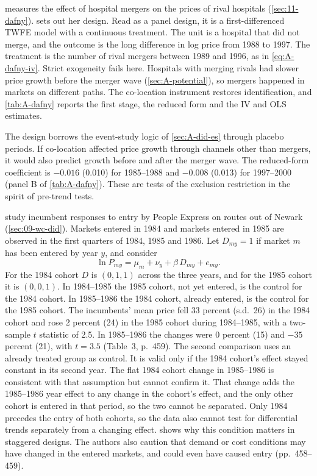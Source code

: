 \citet{Dafny2009} measures the effect of hospital mergers on the prices of rival hospitals (\cref{sec:11-dafny}).
 sets out her design. Read as a panel design, it is a first-differenced TWFE model with a
continuous treatment. The unit is a hospital that did not merge, and the outcome is the long difference in log price
from 1988 to 1997. The treatment is the number of rival mergers between 1989 and 1996, as in \eqref{eq:A-dafny-iv}.
Strict exogeneity fails here. Hospitals with merging rivals had slower price growth before the merger wave
(\cref{sec:A-potential}), so mergers happened in markets on different paths. The co-location instrument restores
identification, and \cref{tab:A-dafny} reports the first stage, the reduced form and the IV and OLS estimates.

The design borrows the event-study logic of \cref{sec:A-did-es} through placebo periods. If co-location affected
price growth through channels other than mergers, it would also predict growth before and after the merger wave.
The reduced-form coefficient is $-0.016$ (0.010) for 1985--1988 and $-0.008$ (0.013) for 1997--2000 (panel B of
\cref{tab:A-dafny}). These are tests of the exclusion restriction in the spirit of pre-trend tests.

\citet{WhinstonCollins1992} study incumbent responses to entry by People Express on routes out of Newark
(\cref{sec:09-wc-did}). Markets entered in 1984 and markets entered in 1985 are observed in the first quarters of
1984, 1985 and 1986. Let $D_{my}=1$ if market $m$ has been entered by year $y$, and consider
\begin{equation*}
\ln P_{my}=\mu_m+\nu_y+\beta\,D_{my}+e_{my}.
\end{equation*}
For the 1984 cohort $D$ is $(0,1,1)$ across the three years, and for the 1985 cohort it is $(0,0,1)$. In 1984--1985
the 1985 cohort, not yet entered, is the control for the 1984 cohort. In 1985--1986 the 1984 cohort, already entered,
is the control for the 1985 cohort. The incumbents' mean price fell 33 percent (s.d.\ 26) in the 1984 cohort and rose
2 percent (24) in the 1985 cohort during 1984--1985, with a two-sample $t$ statistic of 2.5. In 1985--1986 the
changes were 0 percent (15) and $-35$ percent (21), with $t=3.5$ (Table~3, p.~459). The second comparison uses an
already treated group as control. It is valid only if the 1984 cohort's effect stayed constant in its second year.
The flat 1984 cohort change in 1985--1986 is consistent with that assumption but cannot confirm it. That change adds the
1985--1986 year effect to any change in the cohort's effect, and the only other cohort is entered in that period, so the
two cannot be separated. Only 1984 precedes the entry of both cohorts, so the data also cannot test for differential
trends separately from a changing effect.  shows why this
condition matters in staggered designs. The authors also caution that demand or cost conditions may have changed in
the entered markets, and could even have caused entry (pp.~458--459).

